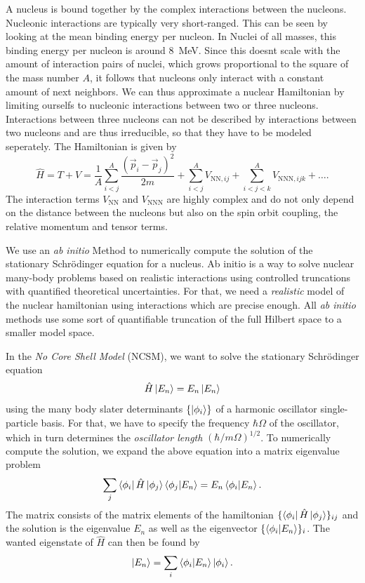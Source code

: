 
A nucleus is bound together by the complex interactions between the nucleons. Nucleonic interactions are typically very short-ranged. This can be seen by looking at the mean binding energy per nucleon. In Nuclei of all masses, this binding energy per nucleon is around \SI{8}{\mega\electronvolt}. Since this doesnt scale with the amount of interaction pairs of nuclei, which grows proportional to the square of the mass number $A$, it follows that nucleons only interact with a constant amount of next neighbors. We can thus approximate a nuclear Hamiltonian by limiting ourselfs to nucleonic interactions between two or three nucleons. Interactions between three nucleons can not be described by interactions between two nucleons and are thus irreducible, so that they have to be modeled seperately. The Hamiltonian is given by
\begin{equation}
  \hat{H} = T + V = \frac{1}{A}\sum_{i<j}^A\frac{(\vec{p}_i - \vec{p}_j)^2}{2m} + \sum_{i<j}^A V_{\mathrm{NN}, ij} + \sum_{i<j<k}^AV_{\mathrm{NNN}, ijk} + \dots.
\end{equation}
The interaction terms $V_\mathrm{NN}$ and $V_\mathrm{NNN}$ are highly complex and do not only depend on the distance between the nucleons but also on the spin orbit coupling, the relative momentum and tensor terms.

We use an \textit{ab initio} Method to numerically compute the solution of the stationary Schrödinger equation for a nucleus. Ab initio is a way to solve nuclear many-body problems based on realistic interactions using controlled truncations with quantified theoretical uncertainties. For that, we need a \textit{realistic} model of the nuclear hamiltonian using interactions which are precise enough. All \textit{ab initio} methods use some sort of quantifiable truncation of the full Hilbert space to a smaller model space.

In the \textit{No Core Shell Model} (NCSM), we want to solve the stationary Schrödinger equation
\begin{equation}
  \hat{H} \ket{E_n} = E_n \ket{E_n}
\end{equation}
using the many body slater determinants $\{\ket{\phi_i}\}$ of a harmonic oscillator single-particle basis. For that, we have to specify the frequency $\hbar \Omega$ of the oscillator, which in turn determines the \textit{oscillator length} $(\hbar / m\Omega)^{1/2}$. To numerically compute the solution, we expand the above equation into a matrix eigenvalue problem
\begin{equation}
  \sum_j \bra{\phi_i}\hat{H}\ket{\phi_j}\braket{\phi_j | E_n} = E_n \braket{\phi_i | E_n}.
\end{equation}
The matrix consists of the matrix elements of the hamiltonian $\{\bra{\phi_i}\hat{H}\ket{\phi_j}\}_{ij}$ and the solution is the eigenvalue $E_n$ as well as the eigenvector $\{\braket{\phi_i|E_n}\}_i$. The wanted eigenstate of $\hat{H}$ can then be found by
\begin{equation}
  \ket{E_n} = \sum_i \braket{\phi_i | E_n} \ket{\phi_i}.
\end{equation}

